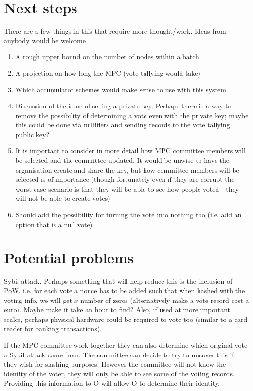 \documentclass{article}
\begin{document}
\section{Next steps}
There are a few things in this that require more thought/work. Ideas from anybody would be welcome
\begin{enumerate}
    \item A rough upper bound on the number of nodes within a batch
    \item A projection on how long the MPC (vote tallying would take)
    \item Which accumulator schemes would make sense to use with this system
    \item Discussion of the issue of selling a private key. Perhaps there is a way to remove the possibility of determining a vote even with the private key; maybe this could be done via nullifiers and sending records to the vote tallying public key?
    \item It is important to consider in more detail how MPC committee members will be selected and the committee updated. It would be unwise to have the organisation create and share the key, but how committee members will be selected is of importance (though fortunately even if they are corrupt the worst case scenario is that they will be able to see how people voted - they will not be able to create votes)
    \item Should add the possibility for turning the vote into nothing too (i.e. add an option that is a null vote)
\end{enumerate}

\section{Potential problems}
Sybil attack. Perhaps something that will help reduce this is the inclusion of PoW. i.e. for each vote a nonce has to be added such that when hashed with the voting info, we will get $x$ number of zeros (alternatively make a vote record cost a euro). Maybe make it take an hour to find? Also, if used at more important scales, perhaps physical hardware could be required to vote too (similar to a card reader for banking transactions).

If the MPC committee work together they can also determine which original vote a Sybil attack came from. The committee can decide to try to uncover this if they wish for slashing purposes. However the committee will not know the identity of the voter, they will only be able to see some of the voting records. Providing this information to O will allow O to determine their identity.
\end{document}
